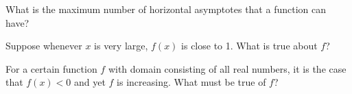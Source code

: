 \documentclass{ximera}
\newcommand{\recommendation}[1]{}
\newcommand{\GoodQuestions}[1]{}
\begin{document}
\begin{shuffle}



\begin{problem}
  \recommendation{Vic}
  \GoodQuestions{Subject: Limits 19Q}
  What is the maximum number of horizontal asymptotes that a function
  can have?
  \begin{multipleChoice}
  \end{multipleChoice}
\end{problem}


\begin{problem}
  Suppose whenever $x$ is very large, $f(x)$ is close to 1.  What is true about $f$?
  \begin{multipleChoice}
  \end{multipleChoice}
\end{problem}

\begin{problem}
  For a certain function $f$ with domain consisting of all real
  numbers, it is the case that $f(x) < 0$ and yet $f$ is increasing.
  What must be true of $f$?
  \begin{multipleChoice}
  \end{multipleChoice}
\end{problem}



\end{shuffle}
\end{document}
